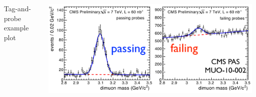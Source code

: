 \documentclass[compress]{beamer}
\begin{document}
\begin{frame}
\begin{columns}
\vspace{0.5 cm}
Tag-and-probe example plot

\includegraphics[width=\linewidth]{dimuons/muon_tag_and_probe.png}
\end{columns}
\end{frame}
\end{document}
